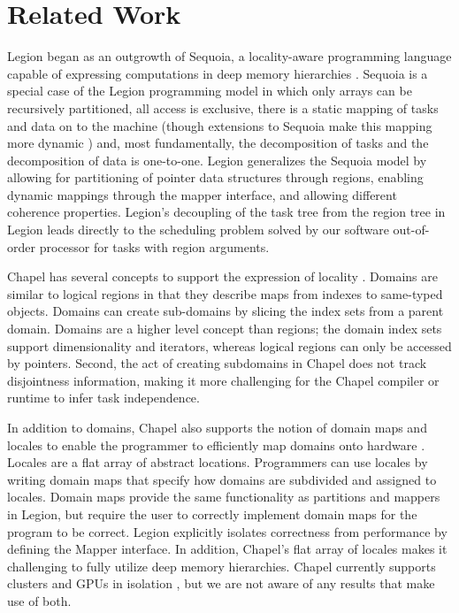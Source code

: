
\section{Related Work}
\label{sec:related}

Legion began as an outgrowth of Sequoia, a locality-aware programming language capable
of expressing computations in deep memory hierarchies
\cite{Fatahalian06}.  Sequoia is a special case of the Legion
programming model in which only arrays can be recursively partitioned,
all access is exclusive, there is a static mapping of tasks and data on to the machine (though
extensions to Sequoia make this mapping more dynamic \cite{BCSA11}) and, most fundamentally, the decomposition of tasks and the decomposition
of data is one-to-one.  Legion generalizes the Sequoia model by allowing for
partitioning of pointer data structures through regions, enabling dynamic mappings through
the mapper interface, and allowing different coherence
properties.  Legion's decoupling of the task tree from the region tree in Legion leads directly to the scheduling problem solved by our software out-of-order processor for tasks with region arguments.

Chapel has several concepts to support the expression of locality \cite{Chamberlain:Chapel}.
Domains are similar to logical regions in that they describe maps from indexes
to same-typed objects.  Domains can create sub-domains by slicing the index sets from
a parent domain.  Domains are a higher level concept than regions; the domain index sets 
support dimensionality and iterators, whereas  logical regions can only be accessed by pointers.  
Second, the act of creating subdomains in Chapel does not track disjointness information,
making it more challenging for the Chapel compiler or runtime to infer task independence.

In addition to domains, Chapel also supports the notion of domain maps and locales to enable 
the programmer to efficiently map domains onto hardware \cite{CHAPEL11}.  Locales are a flat array
of abstract locations.  Programmers can use locales by writing domain maps that specify
how domains are subdivided and assigned to locales.  Domain maps provide the same functionality
as partitions and mappers in Legion, but require the user to correctly implement domain
maps for the program to be correct.  Legion explicitly isolates correctness
from performance by defining the Mapper interface.  In addition, Chapel's flat array of locales
makes it challenging to fully utilize deep memory hierarchies.  Chapel currently supports
clusters and GPUs in isolation \cite{CHAPELGPU}, but we are not aware of any results that 
make use of both.

